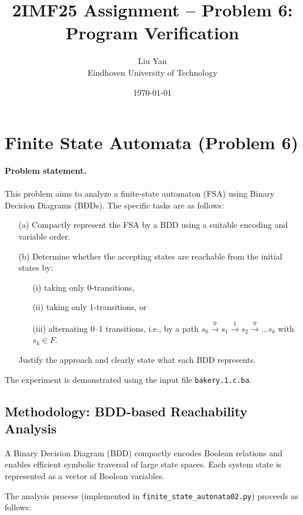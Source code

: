 \documentclass[a4paper,11pt]{article}
\begin{document}
\title{2IMF25 Assignment  – Problem 6: Program Verification}
\author{Liu Yan  \\ Eindhoven University of Technology}
\date{\today}
\maketitle

\section{Finite State Automata (Problem 6)}

\textbf{Problem statement.}\\\\
This problem aims to analyze a finite-state automaton (FSA)
using Binary Decision Diagrams (BDDs).
The specific tasks are as follows:

\begin{enumerate}
  \item[(a)] Compactly represent the FSA by a BDD using a suitable encoding and variable order.
  \item[(b)] Determine whether the accepting states are reachable from the initial states by:
  \begin{itemize}
    \item[(i)] taking only 0-transitions,
    \item[(ii)] taking only 1-transitions, or
    \item[(iii)] alternating 0–1 transitions, i.e., by a path 
    \(s_0 \xrightarrow{0} s_1 \xrightarrow{1} s_2 \xrightarrow{0} \dots s_k \)
    with \(s_k \in F\).
  \end{itemize}
  Justify the approach and clearly state what each BDD represents.
\end{enumerate}

The experiment is demonstrated using the input file \texttt{bakery.1.c.ba}.



\subsection*{Methodology: BDD-based Reachability Analysis}

A Binary Decision Diagram (BDD) compactly encodes Boolean relations 
and enables efficient symbolic traversal of large state spaces.
Each system state is represented as a vector of Boolean variables.

The analysis process (implemented in \texttt{finite\_state\_autonata02.py}) proceeds as follows:
\end{document}
